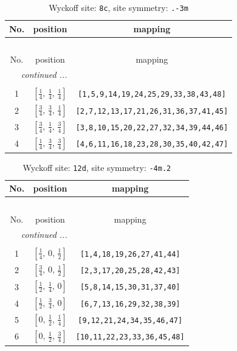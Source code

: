 \documentclass[fleqn,8pt]{jsarticle}
\begin{document}
\renewcommand{\arraystretch}{1.2}
\begin{longtable}{ccc}
\caption{Wyckoff site: {\tt 8c}, site symmetry: {\tt .-3m}}
 \\
 \hline \hline
No. & position & mapping \\ \hline \endfirsthead

\multicolumn{2}{l}{\tablename\ \thetable{}} \\
 \hline \hline
No. & position & mapping \\ \hline \endhead

 \hline \hline
\multicolumn{2}{r}{\footnotesize\it continued ...} \\ \endfoot

 \hline \hline
\multicolumn{2}{r}{} \\ \endlastfoot

1 & $\left[ \frac{1}{4},\, \frac{1}{4},\, \frac{1}{4} \right]$ & {\tt [1,5,9,14,19,24,25,29,33,38,43,48]} \\ \hline
2 & $\left[ \frac{3}{4},\, \frac{3}{4},\, \frac{1}{4} \right]$ & {\tt [2,7,12,13,17,21,26,31,36,37,41,45]} \\ \hline
3 & $\left[ \frac{3}{4},\, \frac{1}{4},\, \frac{3}{4} \right]$ & {\tt [3,8,10,15,20,22,27,32,34,39,44,46]} \\ \hline
4 & $\left[ \frac{1}{4},\, \frac{3}{4},\, \frac{3}{4} \right]$ & {\tt [4,6,11,16,18,23,28,30,35,40,42,47]} \\
\end{longtable}
\renewcommand{\arraystretch}{1.2}
\begin{longtable}{ccc}
\caption{Wyckoff site: {\tt 12d}, site symmetry: {\tt -4m.2}}
 \\
 \hline \hline
No. & position & mapping \\ \hline \endfirsthead

\multicolumn{2}{l}{\tablename\ \thetable{}} \\
 \hline \hline
No. & position & mapping \\ \hline \endhead

 \hline \hline
\multicolumn{2}{r}{\footnotesize\it continued ...} \\ \endfoot

 \hline \hline
\multicolumn{2}{r}{} \\ \endlastfoot

1 & $\left[ \frac{1}{4},\, 0,\, \frac{1}{2} \right]$ & {\tt [1,4,18,19,26,27,41,44]} \\ \hline
2 & $\left[ \frac{3}{4},\, 0,\, \frac{1}{2} \right]$ & {\tt [2,3,17,20,25,28,42,43]} \\ \hline
3 & $\left[ \frac{1}{2},\, \frac{1}{4},\, 0 \right]$ & {\tt [5,8,14,15,30,31,37,40]} \\ \hline
4 & $\left[ \frac{1}{2},\, \frac{3}{4},\, 0 \right]$ & {\tt [6,7,13,16,29,32,38,39]} \\ \hline
5 & $\left[ 0,\, \frac{1}{2},\, \frac{1}{4} \right]$ & {\tt [9,12,21,24,34,35,46,47]} \\ \hline
6 & $\left[ 0,\, \frac{1}{2},\, \frac{3}{4} \right]$ & {\tt [10,11,22,23,33,36,45,48]} \\
\end{longtable}
\end{document}
